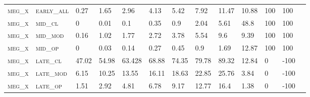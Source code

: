 \begin{landscape}
\begin{table}[!htbp]
\begin{tabular}{@{}lllllllllllll@{}}
\footnotesize \textsc{meg\_x}      & \footnotesize \textsc{early\_all}                & \footnotesize 0.27          & \footnotesize 1.65           & \footnotesize 2.96             & \footnotesize 4.13            & \footnotesize 5.42            & \footnotesize 7.92            & \footnotesize 11.47      & \footnotesize 10.88    & \footnotesize 100    & \footnotesize 100    \\
\footnotesize \textsc{meg\_x}      & \footnotesize \textsc{mid\_cl   }                & \footnotesize 0             & \footnotesize 0.01           & \footnotesize 0.1              & \footnotesize 0.35            & \footnotesize 0.9             & \footnotesize 2.04            & \footnotesize 5.61       & \footnotesize 48.8     & \footnotesize 100    & \footnotesize 100    \\
\footnotesize \textsc{meg\_x}      & \footnotesize \textsc{mid\_mod  }                & \footnotesize 0.16          & \footnotesize 1.02           & \footnotesize 1.77             & \footnotesize 2.72            & \footnotesize 3.78            & \footnotesize 5.54            & \footnotesize 9.6        & \footnotesize 9.39     & \footnotesize 100    & \footnotesize 100    \\
\footnotesize \textsc{meg\_x}      & \footnotesize \textsc{mid\_op   }                & \footnotesize 0             & \footnotesize 0.03           & \footnotesize 0.14             & \footnotesize 0.27            & \footnotesize 0.45            & \footnotesize 0.9             & \footnotesize 1.69       & \footnotesize 12.87    & \footnotesize 100    & \footnotesize 100    \\
\footnotesize \textsc{meg\_x}      & \footnotesize \textsc{late\_cl  }                & \footnotesize 47.02         & \footnotesize 54.98          & \footnotesize 63.428           & \footnotesize 68.88           & \footnotesize 74.35           & \footnotesize 79.78           & \footnotesize 89.32      & \footnotesize 12.84    & \footnotesize 0      & \footnotesize -100    \\
\footnotesize \textsc{meg\_x}      & \footnotesize \textsc{late\_mod }                & \footnotesize 6.15          & \footnotesize 10.25          & \footnotesize 13.55            & \footnotesize 16.11           & \footnotesize 18.63           & \footnotesize 22.85           & \footnotesize 25.76      & \footnotesize 3.84     & \footnotesize 0      & \footnotesize -100    \\
\footnotesize \textsc{meg\_x}      & \footnotesize \textsc{late\_op  }                & \footnotesize 1.51          & \footnotesize 2.92           & \footnotesize 4.81             & \footnotesize 6.78            & \footnotesize 9.17            & \footnotesize 12.77           & \footnotesize 16.4       & \footnotesize 1.38     & \footnotesize 0      & \footnotesize -100    \\

\end{tabular}
\end{table}
\end{landscape}
